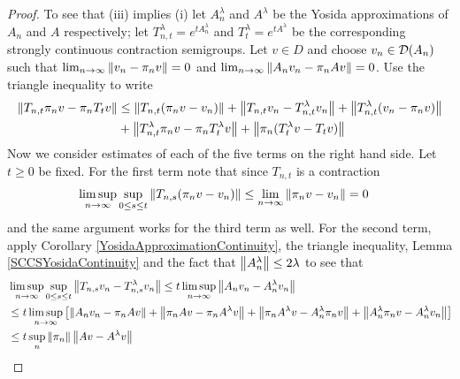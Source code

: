 \begin{proof}
To see that (iii) implies (i) let $A^\lambda_n$ and $A^\lambda$ be the Yosida approximations of $A_n$ and $A$ respectively; let $T^\lambda_{n,t} = e^{t A^\lambda_n}$ and $T^\lambda_t = e^{tA^\lambda}$ be the corresponding strongly continuous contraction semigroups.  Let $v \in D$ and choose $v_n \in \mathcal{D}(A_n)$ such that $\lim_{n \to \infty} \left \lVert v_n - \pi_n v \right \rVert=0$ and $\lim_{n \to \infty} \left \lVert A_n v_n - \pi_nA v \right \rVert=0$.  Use the triangle inequality to write
\begin{align*}
\left \lVert T_{n,t} \pi_n v - \pi_n T_t v \right \rVert &\leq \left \lVert T_{n,t}(\pi_n v - v_n) \right \rVert + \left \lVert T_{n,t}v_n - T^\lambda_{n,t}v_n  \right \rVert + \left \lVert T^\lambda_{n,t} (v_n - \pi_n v) \right \rVert  \\
&+\left \lVert T^\lambda_{n,t} \pi_n v - \pi_n T^\lambda_{t} v  \right \rVert + \left \lVert \pi_n ( T^\lambda_{t} v - T_t v) \right \rVert
\end{align*}
Now we consider estimates of each of the five terms on the right hand side.  Let $t \geq 0$ be fixed.  For the first term note that since $T_{n,t}$ is a contraction
\begin{align*}
\limsup_{n \to \infty} \sup_{0 \leq s \leq t} \left \lVert T_{n,s}(\pi_n v - v_n) \right \rVert  &\leq \lim_{n \to \infty} \left \lVert \pi_n v - v_n \right \rVert  = 0
\end{align*}
and the same argument works for the third term as well.  For the second term, apply Corollary \ref{YosidaApproximationContinuity}, the triangle inequality, Lemma \ref{SCCSYosidaContinuity} and the fact that $\left \lVert A^\lambda_n \right \rVert \leq 2 \lambda$ to see that
\begin{align*}
&\limsup_{n \to \infty} \sup_{0 \leq s \leq t} \left \lVert T_{n,s}v_n - T^\lambda_{n,s}v_n  \right \rVert 
\leq t \limsup_{n \to \infty} \left \lVert A_n v_n - A^\lambda_n v_n \right \rVert \\
&\leq t \limsup_{n \to \infty} \left [ \left \lVert A_n v_n -\pi_n A v \right \rVert + \left \lVert \pi_n A v - \pi_n A^\lambda v \right \rVert + \left \lVert \pi_n A^\lambda v - A^\lambda_n \pi_n v \right \rVert + \left \lVert A^\lambda_n \pi_n v - A^\lambda_n v_n \right \rVert \right]\\
&\leq t \sup_n \left \lVert \pi_n \right \rVert  \left \lVert A v - A^\lambda v \right \rVert
\end{align*}


\end{proof}
